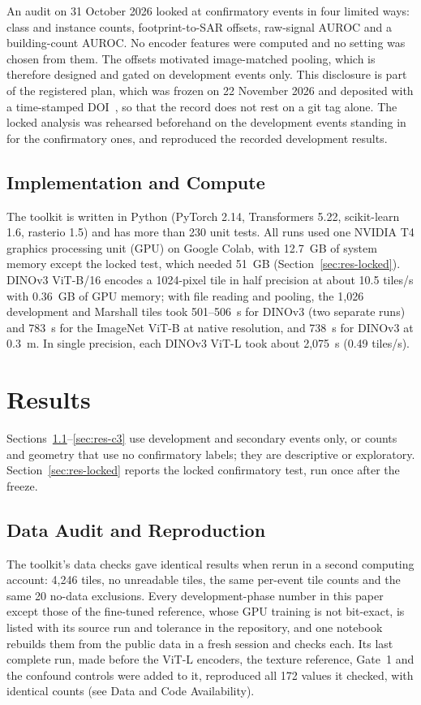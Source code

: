 \documentclass{ieeeaccess}
\begin{document}
An audit on 31 October 2026 looked at confirmatory events in four limited ways: class and instance counts, footprint-to-SAR offsets, raw-signal AUROC and a building-count AUROC. No encoder features were computed and no setting was chosen from them. The offsets motivated image-matched pooling, which is therefore designed and gated on development events only. This disclosure is part of the registered plan, which was frozen on 22 November 2026 and deposited with a time-stamped DOI~\cite{lehan2026prereg}, so that the record does not rest on a git tag alone. The locked analysis was rehearsed beforehand on the development events standing in for the confirmatory ones, and reproduced the recorded development results.

\subsection{Implementation and Compute}
The toolkit is written in Python (PyTorch 2.14, Transformers 5.22, scikit-learn 1.6, rasterio 1.5) and has more than 230 unit tests. All runs used one NVIDIA T4 graphics processing unit (GPU) on Google Colab, with 12.7~GB of system memory except the locked test, which needed 51~GB (Section~\ref{sec:res-locked}). DINOv3 ViT-B/16 encodes a 1024-pixel tile in half precision at about 10.5 tiles/s with 0.36~GB of GPU memory; with file reading and pooling, the 1,026 development and Marshall tiles took 501--506~s for DINOv3 (two separate runs) and 783~s for the ImageNet ViT-B at native resolution, and 738~s for DINOv3 at 0.3~m. In single precision, each DINOv3 ViT-L took about 2,075~s (0.49 tiles/s).

\section{Results}
\label{sec:results}
Sections~\ref{sec:res-audit}--\ref{sec:res-c3} use development and secondary events only, or counts and geometry that use no confirmatory labels; they are descriptive or exploratory. Section~\ref{sec:res-locked} reports the locked confirmatory test, run once after the freeze.

\subsection{Data Audit and Reproduction}
\label{sec:res-audit}
The toolkit's data checks gave identical results when rerun in a second computing account: 4,246 tiles, no unreadable tiles, the same per-event tile counts and the same 20 no-data exclusions. Every development-phase number in this paper except those of the fine-tuned reference, whose GPU training is not bit-exact, is listed with its source run and tolerance in the repository, and one notebook rebuilds them from the public data in a fresh session and checks each. Its last complete run, made before the ViT-L encoders, the texture reference, Gate~1 and the confound controls were added to it, reproduced all 172 values it checked, with identical counts (see Data and Code Availability).
\end{document}
